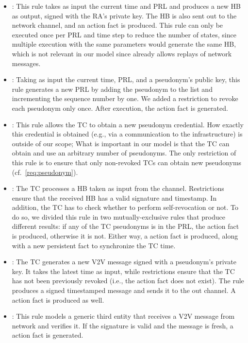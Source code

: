 \begin{itemize}
    \item {}: This rule takes as input the
    current time and \ac{PRL} and produces a new \ac{HB} as output, signed
    with the \ac{RA}'s private key. The \ac{HB} is also sent out to the network
    channel, and an action fact  is produced.
    This rule can only be executed once per \ac{PRL} and time step to reduce
    the number of states, since multiple execution with the same parameters
    would generate the same \ac{HB}, which is not relevant in our model since
    \tamarin{} already allows replays of network messages.
    \item {}: Taking as input the current
    time, \ac{PRL}, and a pseudonym's public key, this rule generates a
    new \ac{PRL} by adding the pseudonym to the list and incrementing the
    sequence number by one. We added a restriction to revoke each pseudonym only
    once. After execution, the action fact  is
    generated.
    \item {}: This rule allows the \ac{TC} to obtain a
    new pseudonym credential. How exactly this credential is obtained (e.g., via
    a communication to the infrastructure) is outside of our scope; What is
    important in our model is that the \ac{TC} can obtain and use an arbitrary
    number of pseudonyms. The only restriction of this rule is to ensure that
    only non-revoked \acp{TC} can obtain new pseudonyms
    (cf.~\cref{req:pseudonym}).
    \item {}: The \ac{TC} processes a \ac{HB}
    taken as input from the channel. Restrictions ensure that the received
    \ac{HB} has a valid signature and timestamp. In addition, the \ac{TC} has to
    check whether to perform self-revocation or not. To do so, we divided this
    rule in two mutually-exclusive rules that produce different results: if any
    of the \ac{TC} pseudonyms is in the \ac{PRL}, the action fact
     is produced, otherwise it is not. Either way, a
     action fact is produced, along with a
    new  persistent fact to synchronize the \ac{TC} time.
    \item {}: The \ac{TC} generates a new \ac{V2V}
    message signed with a pseudonym's private key. It takes the latest time as
    input, while restrictions ensure that the TC has not been previously revoked
    (i.e., the  action fact does not exist). The rule
    produces a signed timestamped message and sends it to the out channel. A
     action fact is produced as well.
    \item {}: This rule models a generic third entity
    that receives a \ac{V2V} message from network and verifies it. If the
    signature is valid and the message is fresh, a
     action fact is generated.
\end{itemize}

